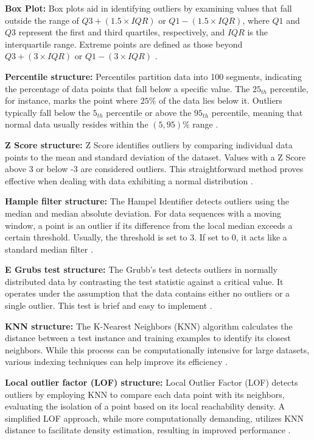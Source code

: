 \documentclass[12pt]{article}
\begin{document}
\textbf{\small Box Plot:} Box plots aid in identifying outliers by
examining values that fall outside the range of $Q3 + (1.5 \times
IQR)$ or $Q1 - (1.5 \times IQR)$, where $Q1$ and $Q3$ represent
the first and third quartiles, respectively, and $IQR$ is the
interquartile range. Extreme points are defined as those beyond
$Q3 + (3 \times IQR)$ or $Q1 - (3 \times IQR)$ \cite{A4}.

\textbf{\small Percentile structure:} Percentiles partition data
into 100 segments, indicating the percentage of data points that
fall below a specific value. The $25_{th}$ percentile, for
instance, marks the point where $25\%$ of the data lies below it.
Outliers typically fall below the $5_{th}$ percentile or above the
$95_{th}$ percentile, meaning that normal data usually resides
within the $(5, 95)\%$ range \cite{A38}.

\textbf{\small Z Score structure:} Z Score identifies outliers by
comparing individual data points to the mean and standard
deviation of the dataset. Values with a Z Score above 3 or below
-3 are considered outliers. This straightforward method proves
effective when dealing with data exhibiting a normal distribution
\cite{A38}.

\textbf{\small Hample filter structure:} The Hampel Identifier
detects outliers using the median and median absolute deviation.
For data sequences with a moving window, a point is an outlier if
its difference from the local median exceeds a certain threshold.
Usually, the threshold is set to 3. If set to 0, it acts like a
standard median filter \cite{A42}.

\textbf{\small E Grubs test structure:} The Grubb's test detects
outliers in normally distributed data by contrasting the test
statistic against a critical value. It operates under the
assumption that the data contains either no outliers or a single
outlier. This test is brief and easy to implement \cite{A44}.

\textbf{\small KNN structure:} The K-Nearest Neighbors (KNN)
algorithm calculates the distance between a test instance and
training examples to identify its closest neighbors. While this
process can be computationally intensive for large datasets,
various indexing techniques can help improve its efficiency
\cite{A46}.

\textbf{\small Local outlier factor (LOF) structure:} Local
Outlier Factor (LOF) detects outliers by employing KNN to compare
each data point with its neighbors, evaluating the isolation of a
point based on its local reachability density. A simplified LOF
approach, while more computationally demanding, utilizes KNN
distance to facilitate density estimation, resulting in improved
performance \cite{A46}.
\end{document}
